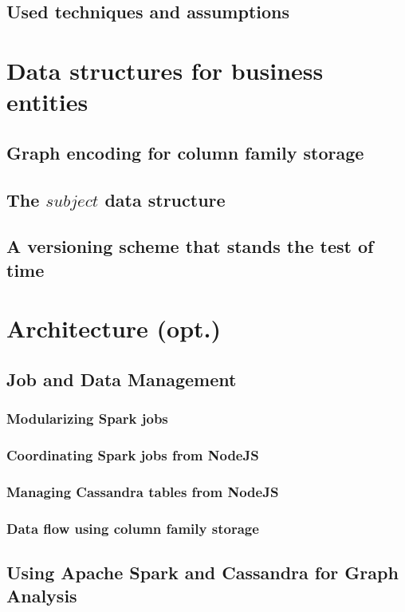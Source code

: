 \documentclass[
        a4paper,     %
        titlepage,   %
        twoside,     %
        parskip      %
        ]{scrartcl}  %
\begin{document}
    \subsection{Used techniques and assumptions}
    \pagebreak

  \section{Data structures for business entities}
    \subsection{Graph encoding for column family storage}
    \subsection{The $subject$ data structure}


    \subsection{A versioning scheme that stands the test of time}
    \pagebreak

  \section{Architecture (opt.)}
    \subsection{Job and Data Management}
      \subsubsection{Modularizing Spark jobs}
      \subsubsection{Coordinating Spark jobs from NodeJS}
      \subsubsection{Managing Cassandra tables from NodeJS}
      \subsubsection{Data flow using column family storage}
    \subsection{Using Apache Spark and Cassandra for Graph Analysis}
\end{document}
